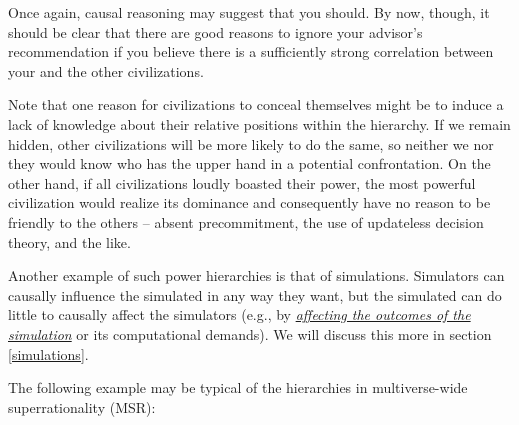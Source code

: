 Once again, causal reasoning may suggest that you should. By now,
though, it should be clear that there are good reasons to ignore your
advisor's recommendation if you believe there is a sufficiently strong
correlation between your and the other civilizations.

Note that one reason for civilizations to conceal themselves might be to
induce a lack of knowledge about their relative positions within the
hierarchy. If we remain hidden, other civilizations will be more likely
to do the same, so neither we nor they would know who has the upper hand
in a potential confrontation. On the other hand, if all civilizations
loudly boasted their power, the most powerful civilization would realize
its dominance and consequently have no reason to be friendly to the
others -- absent precommitment, the use of updateless decision theory,
and the like.

Another example of such power hierarchies is that of simulations.
Simulators can causally influence the simulated in any way they want,
but the simulated can do little to causally affect the simulators (e.g.,
by
\href{https://foundational-research.org/how-the-simulation-argument-dampens-future-fanaticism\#Our_simulated_copies_can_still_impact_the_far_future_by_helping_our_simulators}{\emph{affecting
the outcomes of the simulation}} or its computational demands). We will
discuss this more in section
\ref{simulations}.

The following example may be typical of the hierarchies in
multiverse-wide superrationality (MSR):

